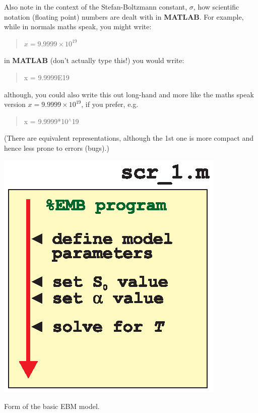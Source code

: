 \documentclass{tufte-book} %
\newenvironment{docspec}{\begin{quotation}\ttfamily\parskip0pt\parindent0pt\ignorespaces}{\end{quotation}}
\newenvironment{docspecnormal}{\begin{quotation}\ttfamily\normalsize\parskip0pt\parindent0pt\ignorespaces}{\end{quotation}}
\begin{document}
Also note in the context of the Stefan-Boltzmann constant, \(\sigma\), how scientific notation (floating point) numbers are dealt with in \textbf{MATLAB}. For example, while in normals maths speak, you might write:
\begin{docspecnormal}
\(x = 9.9999\times 10^{19}\)
\end{docspecnormal}
in \textbf{MATLAB} (don't actually type this!) you would write:
\begin{docspec}
x = 9.9999E19
\end{docspec}
although, you could also write this out long-hand and more like the maths speak version \(x = 9.9999\times 10^{19}\), if you prefer, e.g.
\begin{docspec}
x = 9.9999*10\(^{\wedge}\)19
\end{docspec}
(There are equivalent representations, although the 1st one is more compact and hence less prone to errors (bugs).)

\begin{marginfigure}[0.0in]
\includegraphics[width=\linewidth]{ch8-schematic-scr1.eps}
\caption{Form of the basic EBM model.}
\label{fig:ch8-schematic-scr1}
\end{marginfigure}
\end{document}
